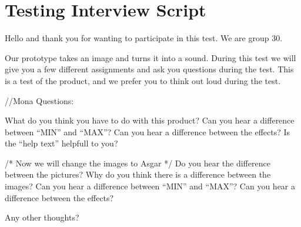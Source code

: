 \chapter{Testing Interview Script}\label{app:interviewscript}
Hello and thank you for wanting to participate in this test. We are group 30.

Our prototype takes an image and turns it into a sound. During this test we will give you a few different assignments and ask you questions during the test. This is a test of the product, and we prefer you to think out loud during the test.

//Mona
Questions: 

What do you think you have to do with this product?
Can you hear a difference between “MIN” and “MAX”?
Can you hear a difference between the effects?
Is the “help text” helpfull to you?

/* Now we will change the images to Asgar */
Do you hear the difference between the pictures?
Why do you think there is a difference between the images?
Can you hear a difference between “MIN” and “MAX”?
Can you hear a difference between the effects?

Any other thoughts?
